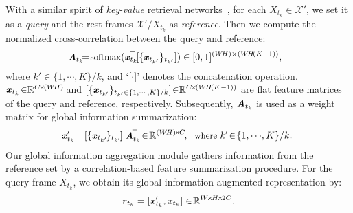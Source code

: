 \documentclass[10pt,twocolumn,letterpaper]{article}
\begin{document}
With a similar spirit of \textit{key}-\textit{value} retrieval networks~\!\cite{sukhbaatar2015end}, for each $X_{t_k}\!\in\!\mathcal{X}'$, we set it as a \textit{query} and the rest frames $\mathcal{X}'/X_{t_k}$ as \textit{reference}. Then we compute the normalized cross-correlation between the query and reference:
\vspace{-1pt}
\begin{equation}\small
\!\!\!\!\textbf{\textit{A}}_{t_k\!}\!\!=\!\text{softmax}({\textbf{\textit{x}}_{t_{k}}}^{\!\!\!\!\!\!\top}[\{\textbf{\textit{x}}_{t_{k'}}\}_{t_{k'}}])\in [0,1]^{(W\!H)\times(W\!H\!(K-1))},
\label{equ:global-coattention}
\vspace{-1pt}
\end{equation}
where $k'\!\in\!\{1,\cdots,K\}/k$, and `[$\cdot$]' denotes the concatenation operation. ${\textbf{\textit{x}}_{t_k}}\!\in_{\!}\!\mathbb{R}^{C\!\times\!(W\!H)\!}$
and $[\{\textbf{\textit{x}}_{t_{k'}}\}_{t_{k'}\in\{1,\cdots,K\}/k}]\!\in_{\!}\!\mathbb{R}^{C\!\times\!(W\!H\!(K-1))}$ are flat feature matrices  of the query and reference, respectively. Subsequently, $\textbf{\textit{A}}_{t_k}$ is used as a weight matrix for global information summarization:
\vspace{-1pt}
\begin{equation}\small
\!\!\!\!\textbf{\textit{x}}'_{t_k}\!=\![\{\textbf{\textit{x}}_{t_{k'\!}}\}_{t_{k'\!}}]~\textbf{\textit{A}}_{t_k}^{\!\top}\!\in \! \mathbb{R}^{(W\!H)\!\times\!C\!},~~\text{where~} k'\!\in\!\{1,\cdots\!,K\}/k.\!\!
\label{equ:aggregation}
\vspace{-1pt}
\end{equation}
Our global information aggregation module gathers information from the reference set by a correlation-based feature summarization procedure. For the query frame $X_{t_{k}}$, we obtain its global information augmented representation by:
\vspace{-1pt}
\begin{equation}\small
\textbf{\textit{r}}_{t_k} = [\textbf{\textit{x}}'_{t_k}, \textbf{\textit{x}}_{t_k}] \in \! \mathbb{R}^{W\! \times \!H\!\times \!2C}.
\vspace{-1pt}
\label{eq:global}
\end{equation}
\end{document}
